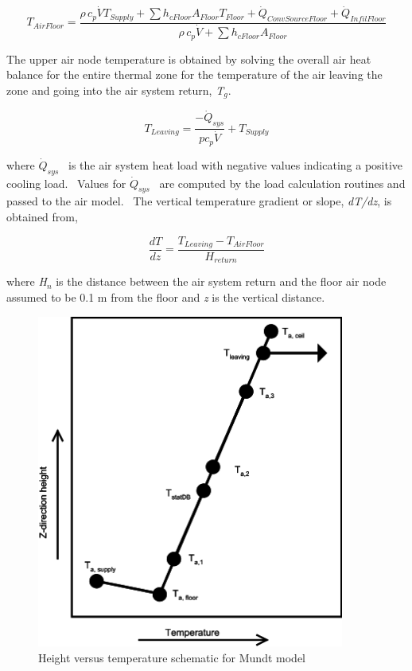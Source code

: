 \begin{equation}
{T_{AirFloor}} = \frac{{\rho \,{c_p}\dot V{T_{Supply}} + \sum {{h_{cFloor}}{A_{Floor}}{T_{Floor}}}  + {{\dot Q}_{ConvSourceFloor}} + {{\dot Q}_{InfilFloor}}}}{{\rho \,{c_p}\dot V + \sum {{h_{cFloor}}{A_{Floor}}} }}
\end{equation}

The upper air node temperature is obtained by solving the overall air heat balance for the entire thermal zone for the temperature of the air leaving the zone and going into the air system return, \emph{T\(_{g}\)}.

\begin{equation}
{T_{Leaving}} = \frac{{ - {{\dot Q}_{sys}}}}{{p{c_p}\dot V}} + {T_{Supply}}
\end{equation}

where \({\dot Q_{sys}}\) ~is the air system heat load with negative values indicating a positive cooling load.~ Values for \({\dot Q_{sys}}\) ~are computed by the load calculation routines and passed to the air model.~ The vertical temperature gradient or slope, \emph{dT/dz}, is obtained from,

\begin{equation}
\frac{{dT}}{{dz}} = \frac{{{T_{Leaving}} - {T_{AirFloor}}}}{{{H_{return}}}}
\end{equation}

where \emph{H\(_{n}\)} is the distance between the air system return and the floor air node assumed to be 0.1 m from the floor and \emph{z} is the vertical distance.

\begin{figure}[hbtp] %
\centering
\includegraphics[width=0.9\textwidth, height=0.9\textheight, keepaspectratio=true]{media/image2341.svg.png}
\caption{  Height versus temperature schematic for Mundt model \protect \label{fig:height-versus-temperature-schematic-for-mundt}}
\end{figure}


